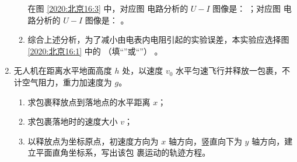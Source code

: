 \begin{enumerate}
\begin{enumerate}
在图 \ref{2020:北京16:3} 中，对应图  电路分析的 $ U-I $ 图像是： \underlinegap ；对应图  电路分析的 $ U-I $ 图像是： \underlinegap 。
\item 
综合上述分析，为了减小由电表内电阻引起的实验误差，本实验应选择图 \ref{2020:北京16:1} 中的 \underlinegap （填“”或“”）
。

\end{enumerate}




\gaokaojs

\item
无人机在距离水平地面高度 $ h $ 处，以速度 $ v_{0} $ 水平匀速飞行并释放一包裹，不计空气阻力，重力加速度为 $ g $。
\begin{enumerate}
\item
求包裹释放点到落地点的水平距离 $ x $；
\item 
求包裹落地时的速度大小 $ v $；
\item 
以释放点为坐标原点，初速度方向为 $ x $ 轴方向，竖直向下为 $ y $ 轴方向，建立平面直角坐标系，写出该包
裹运动的轨迹方程。
\end{enumerate}






\vfill


\end{enumerate}

